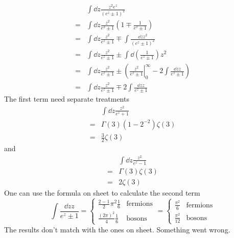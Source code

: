 \begin{enumerate}[label=(\alph*)]
\begin{align*}
   &\int \dd{z} \frac{z^2 e^z}{(e^z \pm 1)^2} \\
  =& \int \dd{z} \frac{z^2}{e^2 \pm 1} \left(  1 \mp \frac{1}{e^z \pm 1} \right) \\
  =& \int \dd{z} \frac{z^2}{e^z \pm 1} \mp \int \frac{\dd{z} z^2}{(e^z \pm 1)^2} \\
  =& \int \dd{z} \frac{z^2}{e^z \pm 1} \pm \int \dd{\left(\frac{1}{e^z \pm 1}\right)} z^2 \\
  =& \int \dd{z} \frac{z^2}{e^z \pm 1} \pm \left( \left.\frac{z^2}{e^z \pm 1}\right|_{0}^{\infty} - 2 \int \frac{\dd{z}z}{e^z \pm 1} \right) \\
  =& \int \dd{z} \frac{z^2}{e^z \pm 1} \mp  2 \int \frac{\dd{z}z}{e^z \pm 1} 
\end{align*}
The first term need separate treatments
\begin{align*}
   &\int \dd{z} \frac{z^2}{e^z + 1} \\
   =& \Gamma(3) (1-2^{-2}) \zeta(3) \\
   =& \frac{3}{2}  \zeta(3)
\end{align*}
and
\begin{align*}
   &\int \dd{z} \frac{z^2}{e^z - 1} \\
   =& \Gamma(3) \zeta(3) \\
   =& 2 \zeta(3)
\end{align*}
One can use the formula on sheet to calculate the second term
\begin{equation*}
   \int \frac{\dd{z}z}{e^z \pm 1} = 
\begin{cases}
   \frac{2 - 1}{2} \pi^2 \frac{1}{6} & \text{fermions} \\
   \frac{(2\pi)^2}{4}\frac{1}{6} & \text{bosons}
\end{cases}
=
\begin{cases}
   \frac{\pi^2}{6} & \text{fermions} \\
   \frac{\pi^2}{12} & \text{bosons}
\end{cases}
\end{equation*}
The results don't match with the ones on sheet. Something went wrong.
\end{enumerate}

